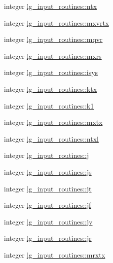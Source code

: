 \begin{DoxyCompactItemize}
integer \hyperlink{namespacelg__input__routines_af5fa6446163aa57d69058b7d7d5a868c}{lg\+\_\+input\+\_\+routines\+::ntx}
\item 
integer \hyperlink{namespacelg__input__routines_add1ae2d6a2e68ee210845e01800d978f}{lg\+\_\+input\+\_\+routines\+::mxvrtx}
\item 
integer \hyperlink{namespacelg__input__routines_a7ee5cd16c5fb97f44fb5578ed560d1cb}{lg\+\_\+input\+\_\+routines\+::mqvr}
\item 
integer \hyperlink{namespacelg__input__routines_a34c8686fc88ac74cc36718879b12800a}{lg\+\_\+input\+\_\+routines\+::mxrs}
\item 
integer \hyperlink{namespacelg__input__routines_a21d152072d7a9e7973cbbe660dad9e88}{lg\+\_\+input\+\_\+routines\+::isys}
\item 
integer \hyperlink{namespacelg__input__routines_af870ce7c9bb6da5f1d9945198c7fa3ee}{lg\+\_\+input\+\_\+routines\+::ktx}
\item 
integer \hyperlink{namespacelg__input__routines_a778a4d42b3609a6eeaf964668eb06b04}{lg\+\_\+input\+\_\+routines\+::k1}
\item 
integer \hyperlink{namespacelg__input__routines_a7265c9a5d503079f944a23462a6dd8fe}{lg\+\_\+input\+\_\+routines\+::mxtx}
\item 
integer \hyperlink{namespacelg__input__routines_adda435e8b5f51edb387d7afc360820e5}{lg\+\_\+input\+\_\+routines\+::ntxl}
\item 
integer \hyperlink{namespacelg__input__routines_a78d4457ced9beccb65b6782146533a24}{lg\+\_\+input\+\_\+routines\+::j}
\item 
integer \hyperlink{namespacelg__input__routines_af9735a6ff4c4888594446ab95b98fb25}{lg\+\_\+input\+\_\+routines\+::js}
\item 
integer \hyperlink{namespacelg__input__routines_ae3ac5398b9c75ed98982459352600852}{lg\+\_\+input\+\_\+routines\+::jt}
\item 
integer \hyperlink{namespacelg__input__routines_a08d8feb2a518243a8007014ea975135c}{lg\+\_\+input\+\_\+routines\+::jf}
\item 
integer \hyperlink{namespacelg__input__routines_aff9789ccbeba0e0c5ea773af2638b107}{lg\+\_\+input\+\_\+routines\+::jv}
\item 
integer \hyperlink{namespacelg__input__routines_a245e9bc7aa95a05dde0ed89e5cfd1dce}{lg\+\_\+input\+\_\+routines\+::jr}
\item 
integer \hyperlink{namespacelg__input__routines_aaae12a94fcec8e8d94a81c9433ff7a5f}{lg\+\_\+input\+\_\+routines\+::mrxtx}

\end{DoxyCompactItemize}
